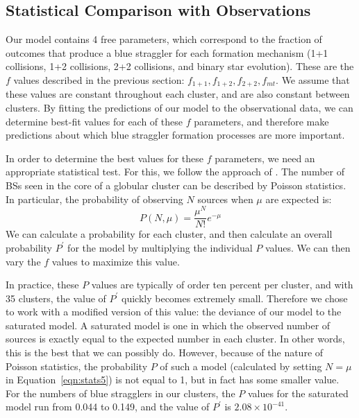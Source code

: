 \subsection{Statistical Comparison with Observations} \label{statistics5}

Our model contains 4 free parameters, which correspond to the fraction of
outcomes that produce a blue straggler for each formation mechanism
(1+1 collisions, 1+2 collisions, 2+2 collisions, and binary star
evolution).  These are the $f$ values
described in the previous section: $f_{1+1}, f_{1+2}, f_{2+2},
f_{mt}$.  We assume that these values are constant throughout each
cluster, and are also constant between clusters.  By fitting the
predictions of our model to the observational data, we can determine
best-fit values for each of these $f$ parameters, and therefore make
predictions about which blue straggler formation processes are
more important. 

In order to determine the best values for these $f$ parameters, we 
need an appropriate statistical test.  For this, we follow the approach
of \citet{verbunt08}.  The number of BSs seen in the core of
a globular cluster can be described by Poisson statistics.  In
particular, the probability of observing $N$ sources when $\mu$ are
expected is:
\begin{equation}
\label{eqn:stats5}
P(N,\mu) = \frac{\mu^N}{N!}e^{-\mu}
\end{equation}
We can calculate a probability for each cluster, and then calculate an 
overall probability $P^{\prime}$ for the model by multiplying the
individual $P$ values.  We can then vary the $f$ values to maximize
this value. 

In practice, these $P$ values are typically of order ten percent per
cluster, and with 35 clusters, the value of $P^{\prime}$ quickly
becomes extremely small.  Therefore we chose to work with a modified
version of this value:  the deviance of our model to the saturated
model.  A saturated model is one in which the observed number of
sources is exactly equal to the expected number in each cluster.  In
other words, this is the best that we can possibly do.  However,
because of the nature of Poisson statistics, the probability $P$ of
such a model (calculated by setting $N=\mu$ in
Equation~\ref{eqn:stats5}) is not equal to 1, but in fact has some
smaller value.  For the numbers of blue stragglers in our clusters,
the $P$ values for the saturated model run from 0.044 to 0.149, and
the value of $P^{\prime}$ is $2.08 \times 10^{-41}$.


